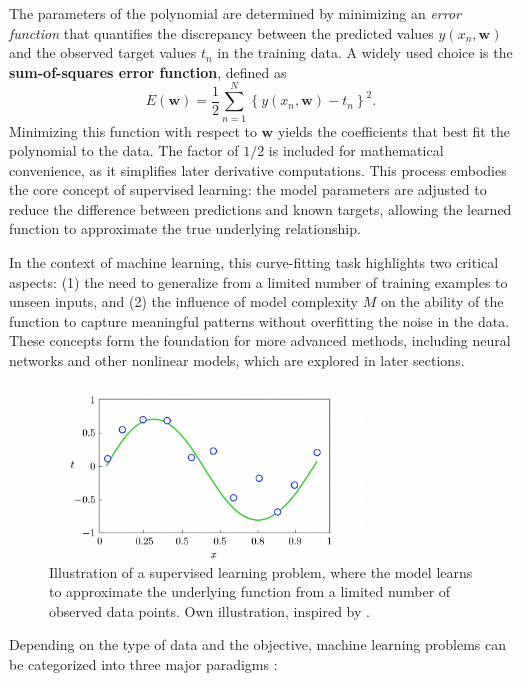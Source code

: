 \documentclass[12pt]{article}
\begin{document}
The parameters of the polynomial are determined by minimizing an \textit{error function} that quantifies the discrepancy between the predicted values \(y(x_n, \mathbf{w})\) and the observed target values \(t_n\) in the training data. 
A widely used choice is the \textbf{sum-of-squares error function}, defined as
\[
E(\mathbf{w}) = \frac{1}{2} \sum_{n=1}^{N} \left\{ y(x_n, \mathbf{w}) - t_n \right\}^2.
\]
Minimizing this function with respect to \(\mathbf{w}\) yields the coefficients that best fit the polynomial to the data. 
The factor of \(1/2\) is included for mathematical convenience, as it simplifies later derivative computations. 
This process embodies the core concept of supervised learning: the model parameters are adjusted to reduce the difference between predictions and known targets, allowing the learned function to approximate the true underlying relationship.

In the context of machine learning, this curve-fitting task highlights two critical aspects: 
(1) the need to generalize from a limited number of training examples to unseen inputs, and 
(2) the influence of model complexity \(M\) on the ability of the function to capture meaningful patterns without overfitting the noise in the data. 
These concepts form the foundation for more advanced methods, including neural networks and other nonlinear models, which are explored in later sections.


\begin{figure}[h!]
    \centering
    \includegraphics[width=0.75\textwidth]{images/pattern_example_1.png} %
    \caption{Illustration of a supervised learning problem, where the model learns to approximate the underlying function from a limited number of observed data points. Own illustration, inspired by \cite{bishop2006pattern}.}
    \label{fig:pattern_example}
\end{figure}

Depending on the type of data and the objective, machine learning problems can be categorized into three major paradigms \cite{bishop2006pattern}:
\end{document}
